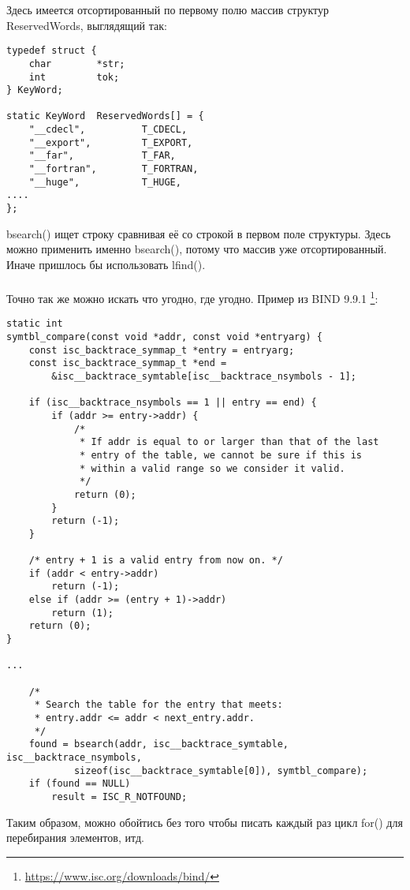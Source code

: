 Здесь имеется отсортированный по первому полю массив структур ReservedWords, выглядящий так:

\begin{lstlisting}[caption=\textbackslash{}bld\textbackslash{}pbide\textbackslash{}defgen\textbackslash{}scan.c]
typedef struct {
    char        *str;
    int         tok;
} KeyWord;

static KeyWord  ReservedWords[] = {
    "__cdecl",          T_CDECL,
    "__export",         T_EXPORT,
    "__far",            T_FAR,
    "__fortran",        T_FORTRAN,
    "__huge",           T_HUGE,
....
};
\end{lstlisting}

bsearch() ищет строку сравнивая её со строкой в первом поле структуры. Здесь можно применить именно bsearch(),
потому что массив уже отсортированный. Иначе пришлось бы использовать lfind().\\
\\
Точно так же можно искать что угодно, где угодно. Пример из BIND 9.9.1
\footnote{\url{https://www.isc.org/downloads/bind/}}:

\begin{lstlisting}[caption=backtrace.c]
static int
symtbl_compare(const void *addr, const void *entryarg) {
	const isc_backtrace_symmap_t *entry = entryarg;
	const isc_backtrace_symmap_t *end =
		&isc__backtrace_symtable[isc__backtrace_nsymbols - 1];

	if (isc__backtrace_nsymbols == 1 || entry == end) {
		if (addr >= entry->addr) {
			/*
			 * If addr is equal to or larger than that of the last
			 * entry of the table, we cannot be sure if this is
			 * within a valid range so we consider it valid.
			 */
			return (0);
		}
		return (-1);
	}

	/* entry + 1 is a valid entry from now on. */
	if (addr < entry->addr)
		return (-1);
	else if (addr >= (entry + 1)->addr)
		return (1);
	return (0);
}

...

	/*
	 * Search the table for the entry that meets:
	 * entry.addr <= addr < next_entry.addr.
	 */
	found = bsearch(addr, isc__backtrace_symtable, isc__backtrace_nsymbols,
			sizeof(isc__backtrace_symtable[0]), symtbl_compare);
	if (found == NULL)
		result = ISC_R_NOTFOUND;
\end{lstlisting}

Таким образом, можно обойтись без того чтобы писать каждый раз цикл for() для перебирания элементов, итд.


